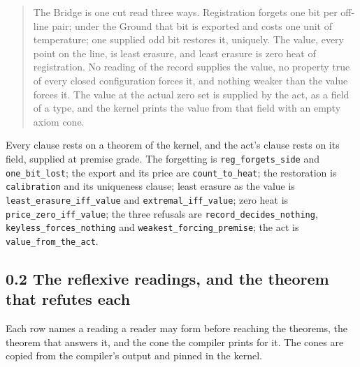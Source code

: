 \documentclass[10pt,twocolumn]{article}
\begin{document}
\begin{quote}
The Bridge is one cut read three ways. Registration forgets one bit per
off-line pair; under the Ground that bit is exported and costs one unit
of temperature; one supplied odd bit restores it, uniquely. The value,
every point on the line, is least erasure, and least erasure is zero
heat of registration. No reading of the record supplies the value, no
property true of every closed configuration forces it, and nothing
weaker than the value forces it. The value at the actual zero set is
supplied by the act, as a field of a type, and the kernel prints the
value from that field with an empty axiom cone.
\end{quote}

Every clause rests on a theorem of the kernel, and the act's clause
rests on its field, supplied at premise grade. The forgetting is
\texttt{reg\_\allowbreak{}forgets\_\allowbreak{}side} and \texttt{one\_\allowbreak{}bit\_\allowbreak{}lost}; the export and
its price are \texttt{count\_\allowbreak{}to\_\allowbreak{}heat}; the restoration is
\texttt{calibration} and its uniqueness clause; least erasure as the
value is \texttt{least\_\allowbreak{}erasure\_\allowbreak{}iff\_\allowbreak{}value} and
\texttt{extremal\_\allowbreak{}iff\_\allowbreak{}value}; zero heat is
\texttt{price\_\allowbreak{}zero\_\allowbreak{}iff\_\allowbreak{}value}; the three refusals are
\texttt{record\_\allowbreak{}decides\_\allowbreak{}nothing}, \texttt{keyless\_\allowbreak{}forces\_\allowbreak{}nothing} and
\texttt{weakest\_\allowbreak{}forcing\_\allowbreak{}premise}; the act is
\texttt{value\_\allowbreak{}from\_\allowbreak{}the\_\allowbreak{}act}.

\hypertarget{the-reflexive-readings-and-the-theorem-that-refutes-each}{%
\subsection{0.2 The reflexive readings, and the theorem that refutes
each}\label{the-reflexive-readings-and-the-theorem-that-refutes-each}}

Each row names a reading a reader may form before reaching the theorems,
the theorem that answers it, and the cone the compiler prints for it.
The cones are copied from the compiler's output and pinned in the
kernel.
\end{document}
